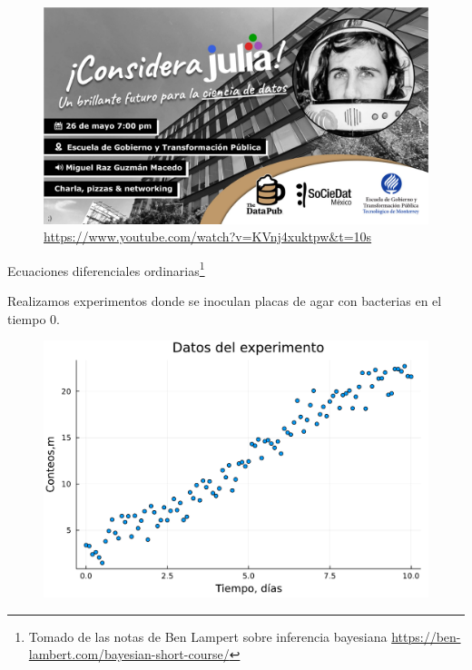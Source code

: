 \documentclass[11pt]{beamer}
\begin{document}
\begin{frame}
	\begin{figure}
		\includegraphics[scale=0.17]{images/raz_julia}
		\caption{\url{https://www.youtube.com/watch?v=KVnj4xuktpw&t=10s}}
	\end{figure}
\end{frame}


\begin{frame}{Ecuaciones diferenciales ordinarias\footnote{Tomado de las notas de Ben Lampert sobre inferencia bayesiana \url{https://ben-lambert.com/bayesian-short-course/}}}

Realizamos experimentos donde se inoculan placas de agar con bacterias en el tiempo 0.
	\begin{figure}
		\includegraphics[scale=0.4]{images/bacterias_experimento.pdf}

	\end{figure}
\end{frame}
\end{document}
